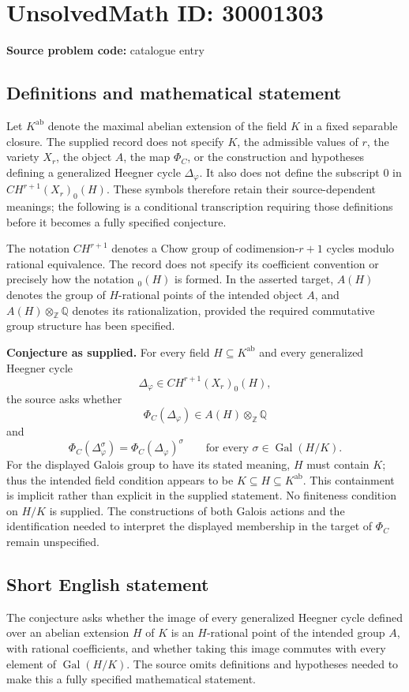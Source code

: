 \documentclass[11pt]{article}
\newcommand{\Z}{\mathbb{Z}}
\newcommand{\Q}{\mathbb{Q}}
\begin{document}
\section*{UnsolvedMath ID: 30001303}
\textbf{Source problem code:} catalogue entry
\subsection{Definitions and mathematical statement}
Let \(K^{\mathrm{ab}}\) denote the maximal abelian extension of the field \(K\) in a fixed separable closure. The supplied record does not specify \(K\), the admissible values of \(r\), the variety \(X_r\), the object \(A\), the map \(\Phi_C\), or the construction and hypotheses defining a generalized Heegner cycle \(\Delta_\varphi\). It also does not define the subscript \(0\) in \(CH^{r+1}(X_r)_0(H)\). These symbols therefore retain their source-dependent meanings; the following is a conditional transcription requiring those definitions before it becomes a fully specified conjecture.

The notation \(CH^{r+1}\) denotes a Chow group of codimension-\(r+1\) cycles modulo rational equivalence. The record does not specify its coefficient convention or precisely how the notation \({}_0(H)\) is formed. In the asserted target, \(A(H)\) denotes the group of \(H\)-rational points of the intended object \(A\), and \(A(H)\otimes_{\Z}\Q\) denotes its rationalization, provided the required commutative group structure has been specified.

\textbf{Conjecture as supplied.} For every field \(H\subseteq K^{\mathrm{ab}}\) and every generalized Heegner cycle
\[
\Delta_\varphi\in CH^{r+1}(X_r)_0(H),
\]
the source asks whether
\[
\Phi_C(\Delta_\varphi)\in A(H)\otimes_{\Z}\Q
\]
and
\[
\Phi_C(\Delta_\varphi^\sigma)
 =\Phi_C(\Delta_\varphi)^\sigma
\qquad\text{for every }\sigma\in\operatorname{Gal}(H/K).
\]
For the displayed Galois group to have its stated meaning, \(H\) must contain \(K\); thus the intended field condition appears to be \(K\subseteq H\subseteq K^{\mathrm{ab}}\). This containment is implicit rather than explicit in the supplied statement. No finiteness condition on \(H/K\) is supplied. The constructions of both Galois actions and the identification needed to interpret the displayed membership in the target of \(\Phi_C\) remain unspecified.
\subsection{Short English statement}
The conjecture asks whether the image of every generalized Heegner cycle defined over an abelian extension \(H\) of \(K\) is an \(H\)-rational point of the intended group \(A\), with rational coefficients, and whether taking this image commutes with every element of \(\operatorname{Gal}(H/K)\). The source omits definitions and hypotheses needed to make this a fully specified mathematical statement.
\end{document}
